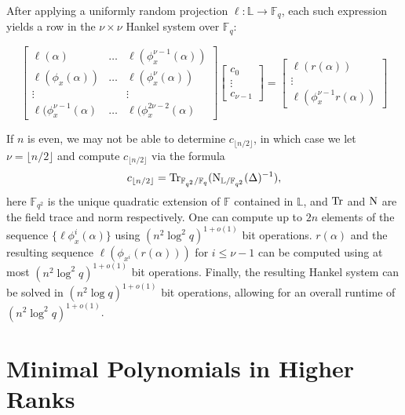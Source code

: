 \documentclass[sigconf]{acmart}
\newcommand{\F}{\mathbb{F}}
\renewcommand{\L}{\mathbb{L}}
\begin{document}
After applying a uniformly random projection $\ell : \L \to \F_q$, each such expression yields a row in the $\nu \times \nu$ Hankel system over $\F_q$:

\begin{equation*}
    \begin{bmatrix}
    \ell(\alpha) & \ldots & \ell(\phi_x^{\nu - 1}(\alpha)) \\
    \ell(\phi_x(\alpha)) & \ldots & \ell(\phi_x^{\nu}(\alpha)) \\
    \vdots & & \vdots \\
    \ell(\phi_x^{\nu - 1}(\alpha) & \ldots & \ell(\phi_x^{2\nu - 2}(\alpha)
    \end{bmatrix}
    \begin{bmatrix}c_0 \\ \vdots \\ c_{\nu - 1} \end{bmatrix} = 
    \begin{bmatrix} \ell (r(\alpha)) \\ \vdots \\ \ell(\phi_x^{\nu - 1}r(\alpha)) \end{bmatrix}
\end{equation*}

If $n$ is even, we may not be able to determine $c_{\lfloor n/2 \rfloor}$, in which case we let $\nu = \lfloor n/2 \rfloor$ and compute $c_{\lfloor n/2 \rfloor}$ via the formula
\begin{equation*}
    c_{\lfloor n/2 \rfloor} = \textnormal{Tr}_{\F_{q^2}/\F_{q}}(\textnormal{N}_{\L/\F_{q^2}}(\Delta)^{-1}),
\end{equation*}
here $\F_{q^2}$ is the unique quadratic extension of $\F$ contained in $\L$, and $\textnormal{Tr}$ and $\textnormal{N}$ are the field trace and norm respectively. One can compute up to $2n$ elements of the sequence $\{ \ell \phi_x^i(\alpha)\}$ using $(n^2 \log^2q)^{1 + o(1)}$ bit operations. $r(\alpha)$ and the resulting sequence $\ell(\phi_{x^i}(r(\alpha)))$ for $i \leq \nu -1$ can be computed using at most $(n^2 \log^2q)^{1 + o(1)}$ bit operations. Finally, the resulting Hankel system can be solved in $(n^2 \log q)^{1 + o(1)}$ bit operations, allowing for an overall runtime of $(n^2 \log^2q)^{1 + o(1)}$. 


\section{Minimal Polynomials in Higher Ranks}
\end{document}
